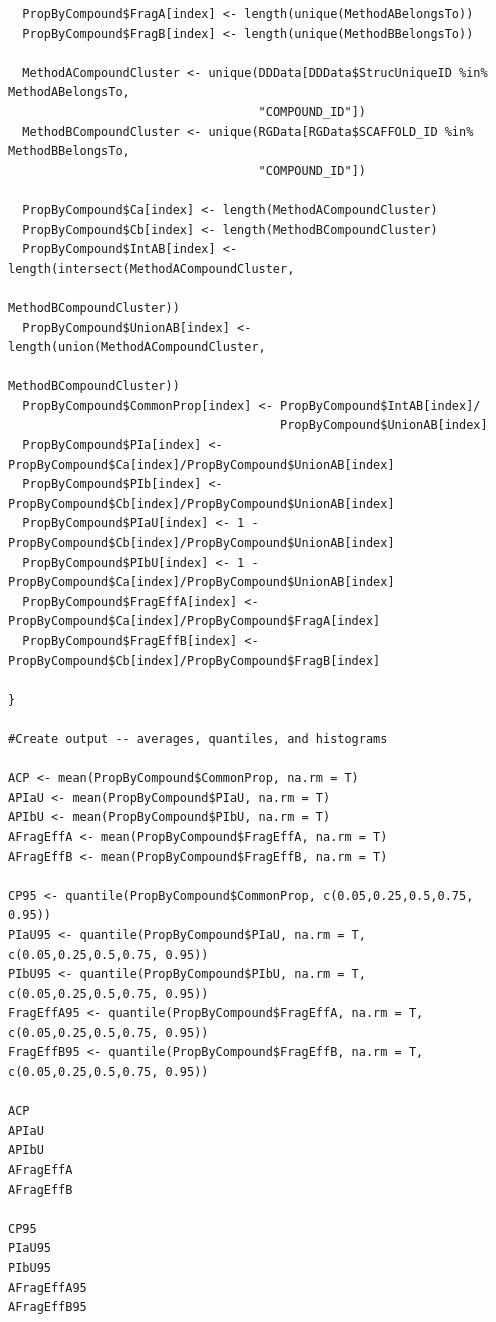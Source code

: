 \documentclass[11pt,letterpaper]{article}
\begin{document}
\begin{verbatim}
  PropByCompound$FragA[index] <- length(unique(MethodABelongsTo))
  PropByCompound$FragB[index] <- length(unique(MethodBBelongsTo))
  
  MethodACompoundCluster <- unique(DDData[DDData$StrucUniqueID %in% MethodABelongsTo,
                                   "COMPOUND_ID"])
  MethodBCompoundCluster <- unique(RGData[RGData$SCAFFOLD_ID %in% MethodBBelongsTo,
                                   "COMPOUND_ID"])
  
  PropByCompound$Ca[index] <- length(MethodACompoundCluster)
  PropByCompound$Cb[index] <- length(MethodBCompoundCluster)
  PropByCompound$IntAB[index] <- length(intersect(MethodACompoundCluster,
                                                  MethodBCompoundCluster))
  PropByCompound$UnionAB[index] <- length(union(MethodACompoundCluster,
                                                    MethodBCompoundCluster))
  PropByCompound$CommonProp[index] <- PropByCompound$IntAB[index]/
                                      PropByCompound$UnionAB[index]
  PropByCompound$PIa[index] <- PropByCompound$Ca[index]/PropByCompound$UnionAB[index]
  PropByCompound$PIb[index] <- PropByCompound$Cb[index]/PropByCompound$UnionAB[index]
  PropByCompound$PIaU[index] <- 1 - PropByCompound$Cb[index]/PropByCompound$UnionAB[index]
  PropByCompound$PIbU[index] <- 1 - PropByCompound$Ca[index]/PropByCompound$UnionAB[index]
  PropByCompound$FragEffA[index] <- PropByCompound$Ca[index]/PropByCompound$FragA[index]
  PropByCompound$FragEffB[index] <- PropByCompound$Cb[index]/PropByCompound$FragB[index]
  
}

#Create output -- averages, quantiles, and histograms

ACP <- mean(PropByCompound$CommonProp, na.rm = T)
APIaU <- mean(PropByCompound$PIaU, na.rm = T)
APIbU <- mean(PropByCompound$PIbU, na.rm = T)
AFragEffA <- mean(PropByCompound$FragEffA, na.rm = T)
AFragEffB <- mean(PropByCompound$FragEffB, na.rm = T)

CP95 <- quantile(PropByCompound$CommonProp, c(0.05,0.25,0.5,0.75, 0.95))
PIaU95 <- quantile(PropByCompound$PIaU, na.rm = T, c(0.05,0.25,0.5,0.75, 0.95))
PIbU95 <- quantile(PropByCompound$PIbU, na.rm = T, c(0.05,0.25,0.5,0.75, 0.95))
FragEffA95 <- quantile(PropByCompound$FragEffA, na.rm = T, c(0.05,0.25,0.5,0.75, 0.95))
FragEffB95 <- quantile(PropByCompound$FragEffB, na.rm = T, c(0.05,0.25,0.5,0.75, 0.95))

ACP
APIaU
APIbU
AFragEffA
AFragEffB

CP95
PIaU95
PIbU95
AFragEffA95
AFragEffB95


\end{verbatim}
\end{document}
